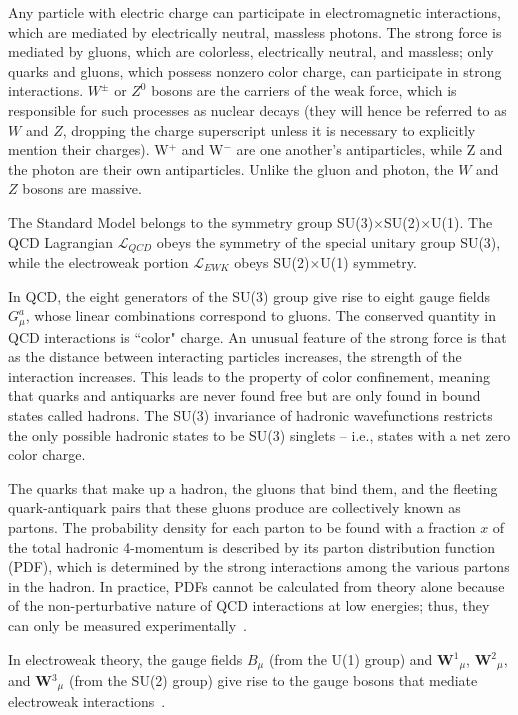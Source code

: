 Any particle with electric charge can participate in electromagnetic interactions, which are mediated by electrically neutral, massless photons. The strong force is mediated by gluons, which are colorless, electrically neutral, and massless; only quarks and gluons, which possess nonzero color charge, can participate in strong interactions. $W^{\pm}$ or $Z^{0}$ bosons are the carriers of the weak force, which is responsible for such processes as nuclear decays (they will hence be referred to as $W$ and $Z$, dropping the charge superscript unless it is necessary to explicitly mention their charges). W$^{+}$ and W$^{-}$ are one another's antiparticles, while Z and the photon are their own antiparticles. Unlike the gluon and photon, the $W$ and $Z$ bosons are massive.

The Standard Model belongs to the symmetry group SU(3)$\times$SU(2)$\times$U(1). The QCD Lagrangian $\mathcal{L}_{QCD}$ obeys the symmetry of the special unitary group SU(3), while the electroweak portion $\mathcal{L}_{EWK}$ obeys SU(2)$\times$U(1) symmetry.

In QCD, the eight generators of the SU(3) group give rise to eight gauge fields $G^{a}_{\mu}$, whose linear combinations correspond to gluons. The conserved quantity in QCD interactions is ``color" charge. An unusual feature of the strong force is that as the distance between interacting particles increases, the strength of the interaction increases. This leads to the property of color confinement, meaning that quarks and antiquarks are never found free but are only found in bound states called hadrons. The SU(3) invariance of hadronic wavefunctions restricts the only possible hadronic states to be SU(3) singlets -- i.e., states with a net zero color charge.

The quarks that make up a hadron, the gluons that bind them, and the fleeting quark-antiquark pairs that these gluons produce are collectively known as partons. The probability density for each parton to be found with a fraction $x$ of the total hadronic 4-momentum is described by its parton distribution function (PDF), which is determined by the strong interactions among the various partons in the hadron. In practice, PDFs cannot be calculated from theory alone because of the non-perturbative nature of QCD interactions at low energies; thus, they can only be measured experimentally~\cite{BettiniPhysics}.

In electroweak theory, the gauge fields $B_{\mu}$ (from the U(1) group) and \textbf{W}$^1$$_{\mu}$, \textbf{W}$^2$$_{\mu}$, and \textbf{W}$^3$$_{\mu}$ (from the SU(2) group) give rise to the gauge bosons that mediate electroweak interactions~\cite{Bednyakov:2007pz}.

